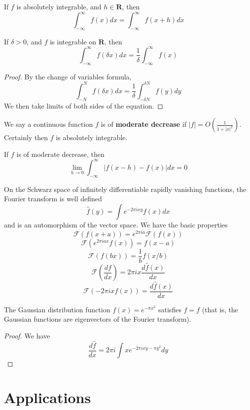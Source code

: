 \begin{corollary}
    If $f$ is absolutely integrable, and $h \in \mathbf{R}$, then
    \[ \int_{-\infty}^\infty f(x) dx = \int_{-\infty}^\infty f(x + h) dx \]
\end{corollary}

\begin{lemma}
    If $\delta > 0$, and $f$ is integrable on $\mathbf{R}$, then
    \[ \int_{-\infty}^\infty f(\delta x) dx = \frac{1}{\delta} \int_{-\infty}^\infty f(x) \]
\end{lemma}
\begin{proof}
    By the change of variables formula,
    \[ \int_{-N}^N f(\delta x) dx = \frac{1}{\delta} \int_{-\delta N}^{\delta N} f(y) dy \]
    We then take limits of both sides of the equation.
\end{proof}

We say a continuous function $f$ is of {\bf moderate decrease} if $|f| = O \left(\frac{1}{1 + |x|^2} \right)$. Certainly then $f$ is absolutely integrable.

\begin{theorem}
    If $f$ is of moderate decrease, then
    \[ \lim_{h \to 0} \int_{-\infty}^\infty |f(x - h) - f(x)| dx = 0 \]
\end{theorem}

On the Schwarz space of infinitely differentiable rapidly vanishing functions, the Fourier transform is well defined
%
\[ \widehat{f}(y) = \int e^{- 2 \pi i x y} f(x) dx \]
%
and is an automorphism of the vector space. We have the basic properties
%
\[ \mathcal{F}(f(x + a)) = e^{2 \pi i a} \mathcal{F}(f(x)) \]
%
\[ \mathcal{F}(e^{2 \pi i a x} f(x)) = f(x-a) \]
%
\[ \mathcal{F}(f(bx)) = \frac{1}{b} f(x/b) \]
%
\[ \mathcal{F}\left( \frac{df}{dx} \right) = 2 \pi i x \frac{d\widehat{f}(x) }{dx} \]
%
\[ \mathcal{F}(- 2 \pi i x f(x)) = \frac{d\widehat{f}(x)}{dx} \]

\begin{theorem}
    The Gaussian distribution function $f(x) = e^{- \pi x^2}$ satisfies $\widehat{f} = f$ (that is, the Gaussian functions are eigenvectors of the Fourier transform).
\end{theorem}
\begin{proof}
    We have
    \[ \frac{d\widehat{f}}{dx} = 2 \pi i \int x e^{-2 \pi i x y - \pi y^2} dy \]
\end{proof}

\chapter{Applications}


